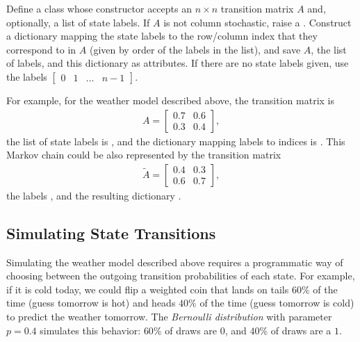 \begin{problem} %
\label{prob:markov-chain-class-constructor}
Define a  class whose constructor accepts an $n\times n$ transition matrix $A$ and, optionally, a list of state labels.
If $A$ is not column stochastic, raise a .
Construct a dictionary mapping the state labels to the row/column index that they correspond to in $A$ (given by order of the labels in the list), and save $A$, the list of labels, and this dictionary as attributes.
If there are no state labels given, use the labels $\begin{bmatrix}0 & 1 & \ldots & n-1\end{bmatrix}$.

For example, for the weather model described above, the transition matrix is
\begin{align*}
    A = \left[\begin{array}{cc}0.7 & 0.6 \\ 0.3 & 0.4\end{array}\right],
\end{align*}
the list of state labels is , and the dictionary mapping labels to indices is .
This Markov chain could be also represented by the transition matrix
\begin{align*}
    \widetilde{A}
    = \left[\begin{array}{cc}
        0.4 & 0.3 \\ 0.6 & 0.7
    \end{array}\right],
\end{align*}
the labels , and the resulting dictionary .
\end{problem}

\subsection*{Simulating State Transitions} %

Simulating the weather model described above requires a programmatic way of choosing between the outgoing transition probabilities of each state.
For example, if it is cold today, we could flip a weighted coin that lands on tails $60\%$ of the time (guess tomorrow is hot) and heads $40\%$ of the time (guess tomorrow is cold) to predict the weather tomorrow.
The \emph{Bernoulli distribution} with parameter $p = 0.4$ simulates this behavior: $60\%$ of draws are $0$, and $40\%$ of draws are a $1$.

